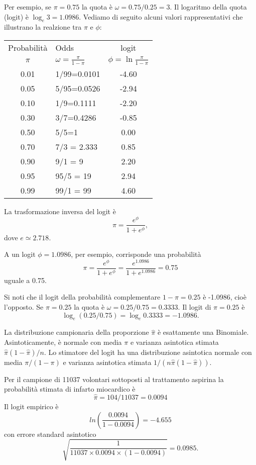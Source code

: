 Per esempio, se $\pi = 0.75$ la quota è $\omega = 0.75/0.25 = 3$.
Il logaritmo della quota (logit) è
$
\log_e 3 = 1.0986.
$
Vediamo di seguito alcuni valori rappresentativi che illustrano la realzione tra $\pi$ e $\phi$:
\begin{center}
\begin{tabular}{clc}
  \hline
  Probabilità & Odds & logit \\
  $\pi$ & $\omega= \frac{\pi}{1-\pi}$ & $ \phi = \ln \frac{\pi}{1-\pi}$ \\
 \hline
  0.01 & 1/99=0.0101 & -4.60 \\[5pt]
  0.05 & 5/95=0.0526 & -2.94 \\[5pt]
  0.10 & 1/9=0.1111 & -2.20 \\[5pt]
  0.30 & 3/7=0.4286 & -0.85 \\[5pt]
  0.50 & 5/5=1 & 0.00 \\[5pt]
  0.70 & 7/3 = 2.333 & 0.85 \\[5pt]
  0.90 & 9/1 = 9 & 2.20 \\[5pt]
  0.95 & 95/5 = 19 & 2.94 \\[5pt]
  0.99 & 99/1 = 99 & 4.60 \\[5pt]
  \hline
\end{tabular}
\end{center}

La trasformazione inversa del logit è
\[
\pi = \frac{e^{\phi}}{1+e^{\phi}},
\]
dove $e \simeq 2.718$.

A un logit $\phi = 1.0986$, per esempio, corrisponde una probabilità
\[
\pi =
\frac{e^{\phi}}{1+e^{\phi}}=\frac{e^{1.0986}}{1+e^{1.0986}}=0.75
\]
uguale a 0.75.

Si noti che il logit della probabilità complementare $1 -\pi = 0.25$ è -1.0986, cioè l'opposto.
Se $\pi = 0.25$ la quota è $\omega = 0.25/0.75 = 0.3333$.
Il logit di $\pi = 0.25$ è
\[
\log_e (0.25/0.75) = \log_e 0.3333 = -1.0986.
\]

La distribuzione campionaria della proporzione $\hat{\pi}$ è esattamente una Binomiale.
Asintoticamente, è normale con media $\pi$ e varianza asintotica stimata $\hat{\pi}(1 - \hat{\pi})/n$.
Lo stimatore del logit ha una distribuzione asintotica normale con media $\pi/(1 -\pi)$ e varianza asintotica stimata $1/(n \hat{\pi}(1 - \hat{\pi}))$.

\begin{exmp}
Per il campione di 11037 volontari sottoposti al trattamento aspirina la probabilità stimata di infarto miocardico è
\[
\hat{\pi} = 104/11037 = 0.0094
\]
Il logit empirico è
\[
ln \left( \frac{0.0094}{1- 0.0094} \right) =-4.655
\]
con errore standard asintotico
\[
\sqrt{\frac{1}{11037 \times 0.0094 \times (1-0.0094)}}= 0.0985.
\]
\end{exmp}


